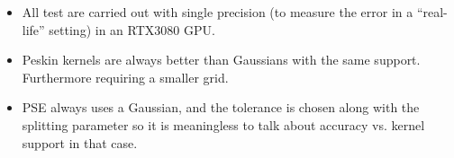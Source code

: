 \documentclass[ twoside,openright,titlepage,numbers=noenddot,%
headinclude,footinclude,cleardoublepage=empty,abstract=on,
BCOR=5mm,paper=a4,fontsize=11pt, dvipsnames
]{scrreprt}
\newcommand{\gpu}{\gls{GPU}\xspace}
\begin{document}
\begin{itemize}
\item All test are carried out with single precision (to measure the error in a ``real-life'' setting) in an RTX3080 \gpu.
\item Peskin kernels are always better than Gaussians with the same support. Furthermore requiring a smaller grid.
\item PSE always uses a Gaussian, and the tolerance is chosen along with the splitting parameter so it is meaningless to talk about accuracy vs. kernel support in that case.
\end{itemize}
\begin{figure}
  \centering
  \label{fig:ibm_gauss3pt}
  \label{fig:ibm_peskin3pt}
  \label{fig:ibm_bm3pt}
  \label{fig:ibm_gauss10pt}

\end{figure}
\end{document}
